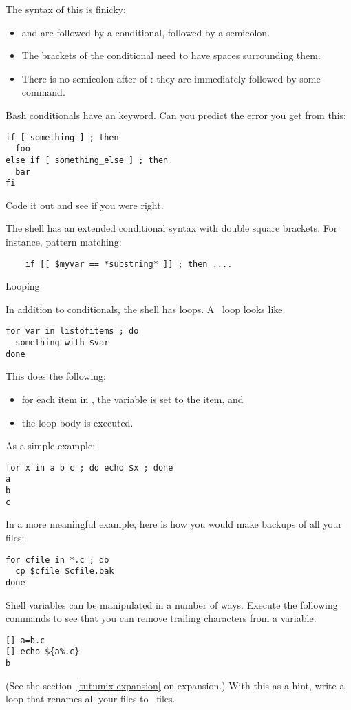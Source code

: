 The syntax of this is finicky:
\begin{itemize}
\item {} and  are followed by a
  conditional, followed by a semicolon.
\item The brackets of the conditional need to have spaces surrounding
  them.
\item There is no semicolon after  of :
  they are immediately followed by some command.
\end{itemize}

\begin{exercise}
  Bash conditionals have an  keyword.
  Can you predict the error you get from this:
\begin{lstlisting}
if [ something ] ; then
  foo
else if [ something_else ] ; then
  bar
fi
\end{lstlisting}
Code it out and see if you were right.
\end{exercise}

\begin{zshnote}
  The  shell has an extended conditional syntax
  with double square brackets.
  For instance, pattern matching:
  \begin{lstlisting}
    if [[ $myvar == *substring* ]] ; then ....
  \end{lstlisting}
\end{zshnote}

 {Looping}
\label{sec:unix-loop}

In addition to conditionals,
the shell has loops. A~ loop looks like
\begin{lstlisting}
for var in listofitems ; do
  something with $var
done
\end{lstlisting}
This does the following:
\begin{itemize}
\item for each item in , the variable  is set to the
  item, and
\item the loop body is executed.
\end{itemize}
As a simple example:
\begin{lstlisting}
for x in a b c ; do echo $x ; done
a
b
c
\end{lstlisting}
In a more meaningful example,
here is how you would make backups of all your~
files:
\begin{lstlisting}
for cfile in *.c ; do
  cp $cfile $cfile.bak
done
\end{lstlisting}
Shell variables can be manipulated in a number of ways.
Execute the following commands to see that you can remove trailing
characters from a variable:
\begin{lstlisting}
[] a=b.c
[] echo ${a%.c}
b
\end{lstlisting}
(See the section~\ref{tut:unix-expansion} on expansion.)
With this as a hint, write a loop that renames all your  files
to~ files.

